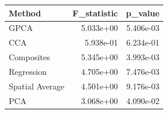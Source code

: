 \begin{tabular}{lrr}
\toprule
Method & F_statistic & p_value \\
\midrule
GPCA & 5.033e+00 & 5.406e-03 \\
CCA & 5.938e-01 & 6.234e-01 \\
Composites & 5.345e+00 & 3.993e-03 \\
Regression & 4.705e+00 & 7.476e-03 \\
Spatial Average & 4.501e+00 & 9.176e-03 \\
PCA & 3.068e+00 & 4.090e-02 \\
\bottomrule
\end{tabular}
